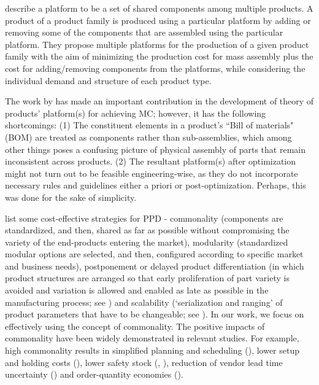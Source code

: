 \documentclass[twoside,onecolumn,12pt,letterpaper]{article}
\begin{document}
\citet{ben2009solving} describe a platform to be a set of shared components among multiple products. A product of a product family is produced using a particular platform by adding or removing some of the components that are assembled using the particular platform. They propose multiple platforms for the production of a given product family with the aim of minimizing the production cost for mass assembly plus the cost for adding/removing components from the platforms, while considering the individual demand and structure of each product type. 

The work by \citet{ben2009solving} has made an important contribution in the development of theory of products' platform(s) for achieving MC; however, it has the following shortcomings: (1) The constituent elements in a product's ``Bill of materials" (BOM) are treated as components rather than sub-assemblies, which among other things poses a confusing picture of physical assembly of parts that remain inconsistent across products. (2) The resultant platform(s) after optimization might not turn out to be feasible engineering-wise, as they do not incorporate necessary rules and guidelines either a priori or post-optimization. Perhaps, this was done for the sake of simplicity. 

\citet{zhang2010simultaneous} list some cost-effective strategies for PPD - commonality (components are standardized, and then, shared as far as possible without compromising the variety of the end-products entering the market), modularity (standardized modular options are selected, and then, configured according to specific market and business needs), postponement or delayed product differentiation (in which product structures are arranged so that early proliferation of part variety is avoided and variation is allowed and enabled as late as possible in the manufacturing process; see \citet{lee1997modelling}) and scalability (‘serialization and ranging’ of product parameters that have to be changeable; see \citet{simpson2001product}). In our work, we focus on effectively using the concept of commonality. The positive impacts of commonality have been widely demonstrated in relevant studies. For example, high commonality results in simplified planning and scheduling (\citet{berry1992product}), lower setup and holding costs (\citet{collier1981measurement}), lower safety stock (\citet{dogramaci1979design}, \citet{baker1985safety}), reduction of vendor lead time uncertainty (\citet{benton1990vendor}) and order-quantity economies (\citet{gerchak1989component}).
\end{document}
